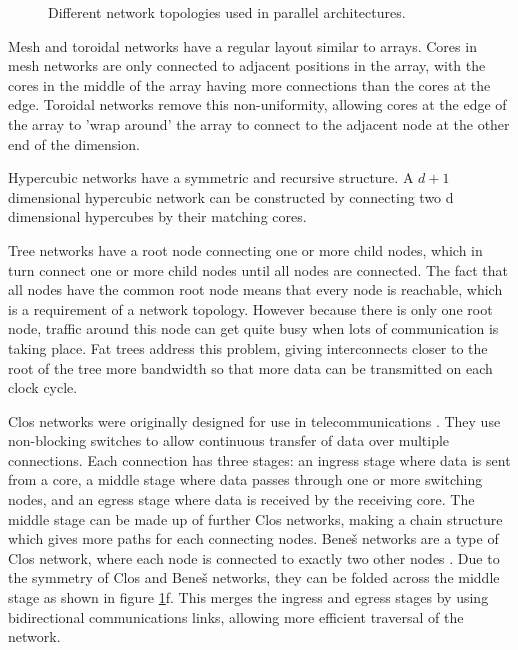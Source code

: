 \documentclass[a4paper, 12pt]{article}
\begin{document}
\begin{figure}[H]
{}
\caption[Different network topologies used in parallel architectures]{Different network topologies used in parallel architectures. \cite{Han14}}
\label{topologies}
\end{figure}

Mesh and toroidal networks have a regular layout similar to arrays. Cores in mesh networks are only connected to adjacent positions in the array, with the cores in the middle of the array having more connections than the cores at the edge. Toroidal networks remove this non-uniformity, allowing cores at the edge of the array to 'wrap around' the array to connect to the adjacent node at the other end of the dimension.

Hypercubic networks have a symmetric and recursive structure. A $d+1$ dimensional hypercubic network can be constructed by connecting two d dimensional hypercubes by their matching cores. 

Tree networks have a root node connecting one or more child nodes, which in turn connect one or more child nodes until all nodes are connected. The fact that all nodes have the common root node means that every node is reachable, which is a requirement of a network topology. However because there is only one root node, traffic around this node can get quite busy when lots of communication is taking place. Fat trees address this problem, giving interconnects closer to the root of the tree more bandwidth so that more data can be transmitted on each clock cycle.

Clos networks were originally designed for use in telecommunications \cite{Clo53}. They use non-blocking switches to allow continuous transfer of data over multiple connections. Each connection has three stages: an ingress stage where data is sent from a core, a middle stage where data passes through one or more switching nodes, and an egress stage where data is received by the receiving core. The middle stage can be made up of further Clos networks, making a chain structure which gives more paths for each connecting nodes. Bene\v{s} networks are a type of Clos network, where each node is connected to exactly two other nodes \cite{Ben65}. Due to the symmetry of Clos and Bene\v{s} networks, they can be folded across the middle stage as shown in figure \ref{topologies}f. This merges the ingress and egress stages by using bidirectional communications links, allowing more efficient traversal of the network.
\end{document}
